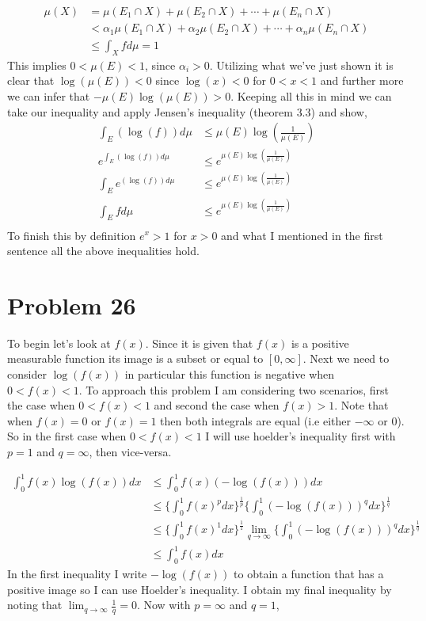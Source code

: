 \documentclass[12pt]{article}
\begin{document}
\begin{align*}
\mu(X) &= \mu(E_{1}\cap X) + \mu(E_{2}\cap X) + \cdots + \mu(E_{n}\cap X)\\
&< \alpha_{1} \mu(E_{1}\cap X) +\alpha_{2} \mu(E_{2}\cap X) + \cdots +\alpha_{n} \mu(E_{n}\cap X)\\
&\leq \int_{X}fd\mu = 1
\end{align*}
This implies $0< \mu(E) < 1$, since $\alpha_{i} > 0$. Utilizing what
we've just shown it is clear that $\log(\mu(E)) < 0$ since $\log(x) <
0$ for $0<x<1$ and further more we can infer that $-\mu(E)\log(\mu(E))
> 0$. Keeping all this in mind we can take our inequality and apply
Jensen's inequality (theorem $3.3$) and show,
\begin{align*}
\int_{E}(\log(f))d\mu &\leq \mu(E)\log(\frac{1}{\mu(E)})\\
e^{\int_{E}(\log(f))d\mu} &\leq e^{\mu(E)\log(\frac{1}{\mu(E)})}\\
\int_{E}e^{(\log(f))d\mu} &\leq e^{\mu(E)\log(\frac{1}{\mu(E)})}\\
\int_{E} f d\mu &\leq e^{\mu(E)\log(\frac{1}{\mu(E)})}\\
\end{align*}   
To finish this by definition $e^{x} > 1$ for $x > 0$ and what I
mentioned in the first sentence all the above inequalities hold.
\section*{Problem 26}
To begin let's look at $f(x)$. Since it is given that $f(x)$ is a
positive measurable function its image is a
subset or equal to $[0, \infty]$. Next we need to consider
$\log(f(x))$ in particular this function is negative when
$0<f(x)<1$. To approach this problem I am considering two scenarios,
first the case when $0<f(x)<1$ and second the case when $f(x) >
1$. Note that when $f(x) = 0$ or $f(x) = 1$ then both integrals are
equal (i.e either $-\infty$ or $0$). So in the first case when
$0<f(x)<1$ I will use hoelder's inequality first with $p = 1$ and $q =
\infty$, then vice-versa.

\begin{align*}
  \int_{0}^{1}f(x)\log(f(x))dx &\leq \int_{0}^{1}f(x)(-\log(f(x)))dx\\
  &\leq \Big\{ \int_{0}^{1}f(x)^{p}dx \Big \}^{\frac{1}{p}} \Big \{  \int_{0}^{1}(-\log(f(x)))^{q}dx \Big \}^{\frac{1}{q}}\\
  &\leq \Big\{ \int_{0}^{1}f(x)^{1}dx \Big \}^{\frac{1}{1}} \lim_{q
    \to\infty}\Big \{  \int_{0}^{1}(-\log(f(x)))^{q}dx \Big \}^{\frac{1}{q}}\\
  &\leq \int_{0}^{1}f(x)dx
\end{align*}
In the first inequality I write $-\log(f(x))$ to
obtain a function that has a positive image so I can use Hoelder's
inequality. I obtain my final inequality by noting that $\lim_{q
  \to\infty}\frac{1}{q} = 0$. Now with $p = \infty$ and $q = 1$,
\end{document}
